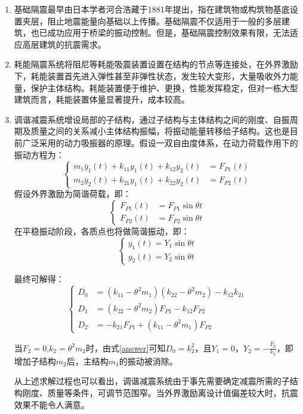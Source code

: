 \begin{enumerate}
	\item 基础隔震最早由日本学者河合浩藏于1881年提出，指在建筑物或构筑物基底设置夹层，阻止地震能量向基础以上传播。基础隔震不仅适用于一般的多层建筑，也已成功应用于桥梁的振动控制。但是，基础隔震控制效果有限，无法适应高层建筑的抗震需求\cite{Sun2012}。
	\item 耗能隔震系统将阻尼等耗能吸震装置设置在结构的节点等连接处，在外界激励下，耗能装置首先进入弹性甚至非弹性状态，发生较大变形，大量吸收外力能量，保护主体结构。耗能装置便于维护、更换，性能发挥稳定，但对一栋大型建筑而言，耗能装置体量显著提升，成本较高。
	\item 调谐减震系统增设局部的子结构，通过子结构与主体结构之间的刚度、自振周期及质量之间的关系减小主体结构振幅，将振动能量转移给子结构。这也是目前广泛采用的动力吸振器的原理。假设一双自由度体系，在动力荷载作用下的振动方程为：
	\begin{equation}
	\label{vibration}
	\left\{
	\begin{array}{rl}
	m_1\ddot{y_1}\left(t\right)+k_{11}y_1\left(t\right)+k_{12}y_2\left(t\right)&=F_{P1}\left(t\right)\\
	m_2\ddot{y_2}\left(t\right)+k_{21}y_1\left(t\right)+k_{22}y_2\left(t\right)&=F_{P2}\left(t\right)
	\end{array}
	\right.
	\end{equation}
	假设外界激励为简谐荷载，即：
	\begin{equation}
	\label{sin}
	\left\{
	\begin{array}{rl}
	F_{P1}\left(t\right)&=F_{P1}\sin \theta t\\
	F_{P2}\left(t\right)&=F_{P2}\sin \theta t
	\end{array}
	\right.
	\end{equation}
	在平稳振动阶段，各质点也将做简谐振动，即：
	\begin{equation}
	\label{sinMove}
	\left\{
	\begin{array}{rl}
	y_{1}\left(t\right)=Y_{1}\sin \theta t\\
	y_{2}\left(t\right)=Y_{2}\sin \theta t
	\end{array}
	\right.
	\end{equation}
	
	最终可解得：
	\begin{equation}
	\label{answer}
	\left\{
	\begin{array}{rl}
	D_0&=\left(k_{11}-\theta^2m_1\right)\left(k_{22}-\theta^2m_2\right)-k_{12}k_{21} \\
	D_1&=\left(k_{22}-\theta^2m_2\right)F_{P1}-k_{12}F_{P2} \\
	D_2&=-k_{21}F_{P1}+\left(k_{11}-\theta^2m_1\right)F_{P2}
	\end{array}
	\right.
	\end{equation}
	
	当$F_2=0$,$k_2=\theta^2m_2$时，由式\eqref{answer}可知$D_0=k_2^2$，且$Y_1=0$，$Y_2=-\frac{F_p}{k_2}$，即增加子结构$m_2$后，主结构$m_1$的振动被消除。
	
	从上述求解过程也可以看出，调谐减震系统由于事先需要确定减震所需的子结构刚度、质量等条件，可调节范围窄。当外界激励离设计值偏差较大时，抗震效果不能令人满意。
\end{enumerate}


